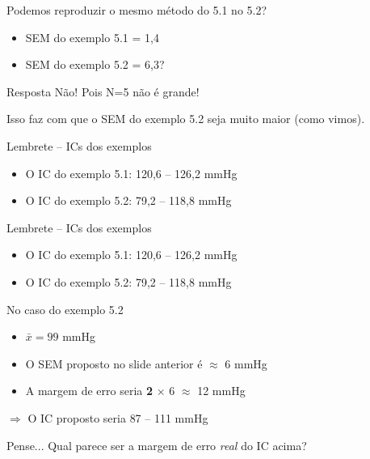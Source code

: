 \documentclass{beamer}
\begin{document}
\begin{frame}{\scriptsize }
    \begin{block}{Podemos reproduzir o mesmo método do 5.1 no 5.2?}
    \footnotesize
  \begin{itemize}
    \footnotesize
  \item SEM do exemplo 5.1 = 1,4
  \item SEM do exemplo 5.2 = 6,3?
  \end{itemize}
  \end{block}
  \bigskip
  \begin{block}{Resposta}
    \footnotesize
    Não! Pois N=5 não é grande!

    \medskip
    Isso faz com que o SEM do exemplo 5.2 seja muito maior (como vimos).
  \end{block}
  \begin{exampleblock}{Lembrete -- ICs dos exemplos}
    \footnotesize
    \begin{itemize}
      \scriptsize
    \item O IC do exemplo 5.1: 120,6 -- 126,2 mmHg
    \item O IC do exemplo 5.2: 79,2 -- 118,8 mmHg
    \end{itemize}
  \end{exampleblock}
\end{frame}

\begin{frame}{\scriptsize }
  \begin{exampleblock}{Lembrete -- ICs dos exemplos}
    \footnotesize
    \begin{itemize}
      \footnotesize
    \item O IC do exemplo 5.1: 120,6 -- 126,2 mmHg
    \item O IC do exemplo 5.2: \alert{79,2 -- 118,8 mmHg}
    \end{itemize}
  \end{exampleblock}
  \begin{block}{No caso do exemplo 5.2}
    \footnotesize
    \begin{itemize}
      \footnotesize
    \item $\bar{x} = 99$ mmHg
    \item O SEM proposto no slide anterior é $\approx$ 6 mmHg
    \item A margem de erro seria {\bf 2} $\times $ 6 $\approx$ 12 mmHg
    \end{itemize}
      $\Rightarrow$ O IC proposto seria \alert{87 -- 111 mmHg}
  \end{block}
  \begin{block}{Pense...}
    \footnotesize
    Qual parece ser a margem de erro {\em real} do IC acima?
  \end{block}
\end{frame}
\end{document}

